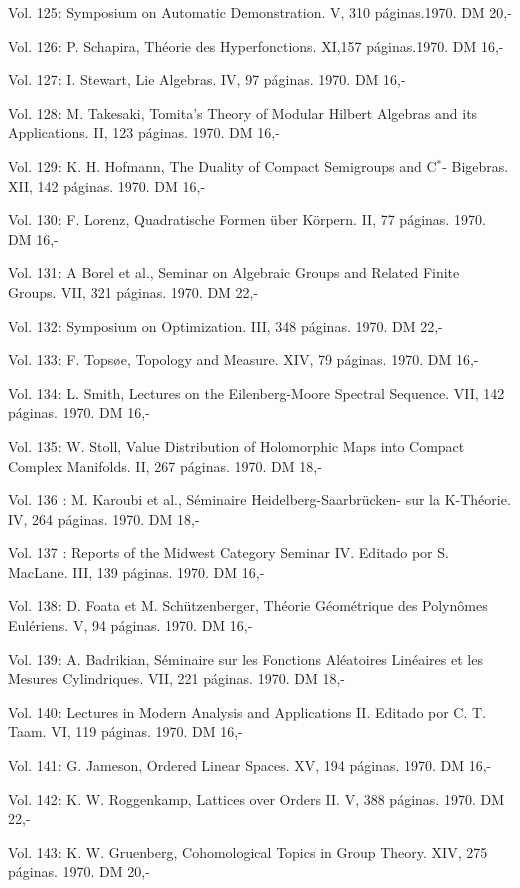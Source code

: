 Vol. 125: Symposium on Automatic Demonstration. V, 310 páginas.1970. DM 20,-

Vol. 126: P. Schapira, Théorie des Hyperfonctions. XI,157 páginas.1970. DM 16,-

Vol. 127: I. Stewart, Lie Algebras. IV, 97 páginas. 1970. DM 16,-

Vol. 128: M. Takesaki, Tomita's Theory of Modular Hilbert Algebras and its Applications. II, 123 páginas. 1970. DM 16,-

Vol. 129: K. H. Hofmann, The Duality of Compact Semigroups and C$^*$- Bigebras. XII, 142 páginas. 1970. DM 16,-

Vol. 130: F. Lorenz, Quadratische Formen über Körpern. II, 77 páginas. 1970. DM 16,-

Vol. 131: A Borel et al., Seminar on Algebraic Groups and Related Finite Groups. VII, 321 páginas. 1970. DM 22,-

Vol. 132: Symposium on Optimization. III, 348 páginas. 1970. DM 22,-

Vol. 133: F. Topsøe, Topology and Measure. XIV, 79 páginas. 1970. DM 16,-

Vol. 134: L. Smith, Lectures on the Eilenberg-Moore Spectral Sequence. VII, 142 páginas. 1970. DM 16,-

Vol. 135: W. Stoll, Value Distribution of Holomorphic Maps into Compact Complex Manifolds. II, 267 páginas. 1970. DM 18,-

Vol. 136 : M. Karoubi et al., Séminaire Heidelberg-Saarbrücken- sur la K-Théorie. IV, 264 páginas. 1970. DM 18,-

Vol. 137 : Reports of the Midwest Category Seminar IV. Editado por S. MacLane. III, 139 páginas. 1970. DM 16,-

Vol. 138: D. Foata et M. Schützenberger, Théorie Géométrique des Polynômes Eulériens. V, 94 páginas. 1970. DM 16,-

Vol. 139: A. Badrikian, Séminaire sur les Fonctions Aléatoires Linéaires et les Mesures Cylindriques. VII, 221 páginas. 1970. DM 18,-

Vol. 140: Lectures in Modern Analysis and Applications II. Editado por C. T. Taam. VI, 119 páginas. 1970. DM 16,-

Vol. 141: G. Jameson, Ordered Linear Spaces. XV, 194 páginas. 1970. DM 16,-

Vol. 142: K. W. Roggenkamp, Lattices over Orders II. V, 388 páginas. 1970. DM 22,-

Vol. 143: K. W. Gruenberg, Cohomological Topics in Group Theory. XIV, 275 páginas. 1970. DM 20,-


